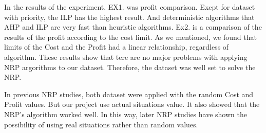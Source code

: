 In the results of the experiment.
EX1. was profit comparison. Exept for dataset with priority, the ILP has the highest result. And deterministic algorithms that AHP and ILP are very fast than heuristic algorithms. Ex2. is a comparison of the results of the profit according to the cost limit. As we mentioned, we found that limits of the Cost and the Profit had a linear relationship, regardless of algorithm. These results show that tere are no major problems with applying NRP argorithms to our dataset. Therefore, the dataset was well set to solve  the NRP.

In previous NRP studies, both dataset were applied with the random Cost and Profit values. But our project use actual situations value. It also showed that the NRP's algorithm worked well. In this way, later NRP studies have shown the possibility of using real situations rather than random values. 


